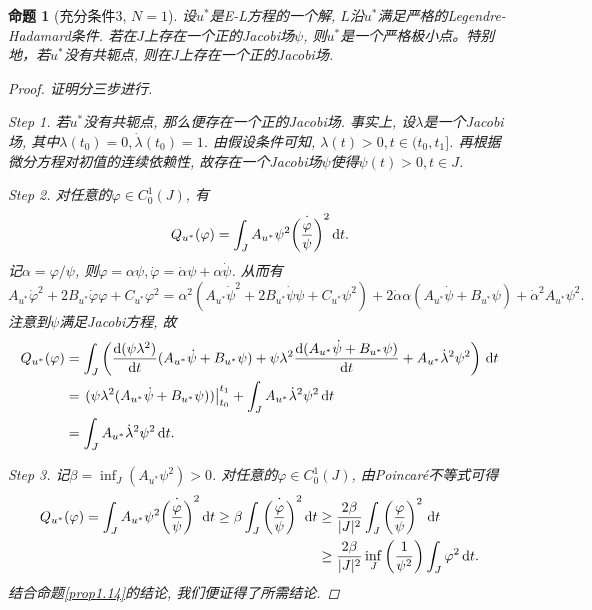 \documentclass[12pt,a4paper]{article}
\newtheorem{proposition}[theorem]{命题}
\begin{document}
\begin{proposition}[充分条件3, $N = 1$]
    设$u^*$是E-L方程的一个解, $L$沿$u^*$满足严格的Legendre-Hadamard条件.
    若在$J$上存在一个正的Jacobi场$\psi$, 则$u^*$是一个严格极小点。特别地，若$u^*$没有共轭点, 则在$J$上存在一个正的Jacobi场.
    \begin{proof}
        证明分三步进行.

        \emph{Step 1.} 若$u^*$没有共轭点, 那么便存在一个正的Jacobi场. 事实上, 设$\lambda$是一个Jacobi场, 其中$\lambda(t_0) = 0, \dot\lambda(t_0) = 1$.
        由假设条件可知, $\lambda(t) > 0, t \in (t_0, t_1]$. 再根据微分方程对初值的连续依赖性, 故存在一个Jacobi场$\psi$使得$\psi(t) > 0, t \in J$.

        \emph{Step 2.} 对任意的$\varphi \in C_0^1(J)$, 有 
        \begin{equation*}
            Q_{u^*}(\varphi)=\int_JA_{u^*}\psi^2\dot{\left(\frac{\varphi}{\psi}\right)}^2 \,{\rm d}t. 
        \end{equation*}
        记$\alpha = \varphi/\psi$, 则$\varphi = \alpha\psi, \dot\varphi = \dot\alpha\psi + \alpha\dot\psi$.
        从而有 
        \begin{equation*}
            A_{u^*}\dot\varphi^2+2B_{u^*}\dot\varphi\varphi+C_{u^*}\varphi^2=\alpha^2(A_{u^*}\dot\psi^2+2B_{u^*}\dot\psi\psi+C_{u^*}\psi^2)+2\dot\alpha\alpha(A_{u^*}\dot\psi+B_{u^*}\psi)+\dot\alpha^2A_{u^*}\psi^2. 
        \end{equation*}
        注意到$\psi$满足Jacobi方程, 故 
        \begin{align*}
            Q_{u^*}(\varphi) &= \int_J\left(\frac{{\rm d}(\psi\lambda^2)}{{\rm d}t}(A_{u^*}\dot\psi+B_{u^*}\psi) + \psi\lambda^2\frac{{\rm d}(A_{u^*}\dot\psi+B_{u^*}\psi) }{{\rm d}t} + A_{u^*}\dot\lambda^2\psi^2\right) \,{\rm d}t \\  
            &= \left.(\psi\lambda^2(A_{u^*}\dot\psi+B_{u^*}\psi))\right|_{t_0}^{t_1} + \int_JA_{u^*}\dot\lambda^2\psi^2\,{\rm d}t \\  
            &= \int_JA_{u^*}\dot\lambda^2\psi^2\,{\rm d}t.
        \end{align*}

        \emph{Step 3.} 记$\beta = \inf_J (A_{u^*}\psi^2) > 0$. 对任意的$\varphi \in C_0^1(J)$, 由Poincaré不等式可得 
        \begin{align*}
            Q_{u^*}(\varphi) = \int_JA_{u^*}\psi^2\dot{\left(\frac{\varphi}{\psi}\right)}^2\,{\rm d}t  \geq \beta\int_J\dot{\left(\frac{\varphi}{\psi}\right)}^2\,{\rm d}t &\geq \frac{2\beta}{|J|^2}\int_J\left(\frac{\varphi}{\psi}\right)^2 \,{\rm d}t 
            \\ &\geq \frac{2\beta}{|J|^2}\inf_J\left(\frac{1}{\psi^2}\right)\int_J\varphi^2 \,{\rm d}t.
        \end{align*}
        结合命题\ref{prop1.14}的结论, 我们便证得了所需结论.
    \end{proof}
\end{proposition}
\end{document}
